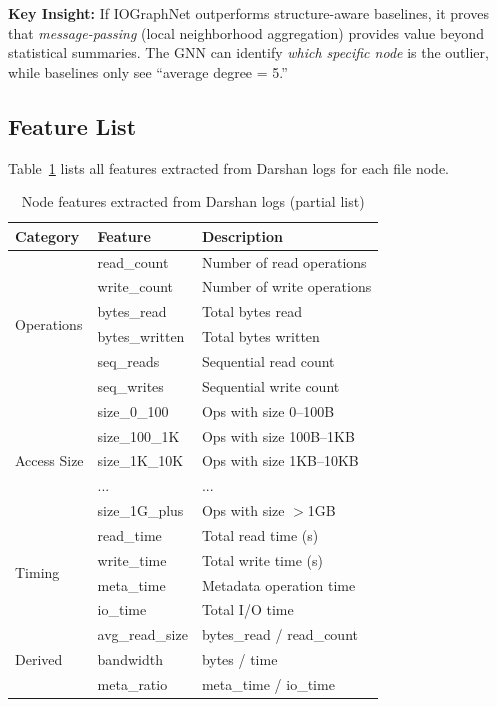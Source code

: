 \textbf{Key Insight:} If IOGraphNet outperforms structure-aware baselines, it proves that \emph{message-passing} (local neighborhood aggregation) provides value beyond statistical summaries.
The GNN can identify \emph{which specific node} is the outlier, while baselines only see ``average degree = 5.''

\subsection{Feature List}

Table~\ref{tab:features} lists all features extracted from Darshan logs for each file node.

\begin{table}[ht]
\caption{Node features extracted from Darshan logs (partial list)}
\label{tab:features}
\small
\begin{tabular}{@{}lll@{}}
\toprule
Category & Feature & Description \\
\midrule
\multirow{6}{*}{Operations} & read\_count & Number of read operations \\
& write\_count & Number of write operations \\
& bytes\_read & Total bytes read \\
& bytes\_written & Total bytes written \\
& seq\_reads & Sequential read count \\
& seq\_writes & Sequential write count \\
\midrule
\multirow{5}{*}{Access Size} & size\_0\_100 & Ops with size 0--100B \\
& size\_100\_1K & Ops with size 100B--1KB \\
& size\_1K\_10K & Ops with size 1KB--10KB \\
& ... & ... \\
& size\_1G\_plus & Ops with size $>$1GB \\
\midrule
\multirow{4}{*}{Timing} & read\_time & Total read time (s) \\
& write\_time & Total write time (s) \\
& meta\_time & Metadata operation time \\
& io\_time & Total I/O time \\
\midrule
\multirow{3}{*}{Derived} & avg\_read\_size & bytes\_read / read\_count \\
& bandwidth & bytes / time \\
& meta\_ratio & meta\_time / io\_time \\
\bottomrule
\end{tabular}
\end{table}

